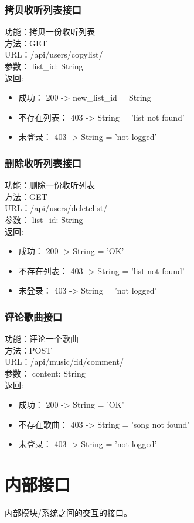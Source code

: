 \subsubsection{拷贝收听列表接口}

\noindent
功能：拷贝一份收听列表\\
方法：GET\\
URL：/api/users/copylist/\\
参数： list\_id: String\\
返回:
\begin{itemize}
	\item 成功： 200 -> new\_list\_id = String
	\item 不存在列表： 403 -> String = 'list not found'
	\item 未登录： 403 -> String = 'not logged'
\end{itemize}

\subsubsection{删除收听列表接口}

\noindent
功能：删除一份收听列表\\
方法：GET\\
URL：/api/users/deletelist/\\
参数： list\_id: String\\
返回:
\begin{itemize}
	\item 成功： 200 -> String = 'OK'
	\item 不存在列表： 403 -> String = 'list not found'
	\item 未登录： 403 -> String = 'not logged'
\end{itemize}

\subsubsection{评论歌曲接口}

\noindent
功能：评论一个歌曲\\
方法：POST\\
URL：/api/music/:id/comment/\\
参数： content: String\\
返回:
\begin{itemize}
	\item 成功： 200 -> String = 'OK'
	\item 不存在歌曲： 403 -> String = 'song not found'
	\item 未登录： 403 -> String = 'not logged'
\end{itemize}


\section{内部接口}
内部模块/系统之间的交互的接口。